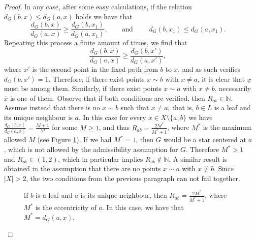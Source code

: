 \documentclass[a4paper,11pt,oneside]{amsart}
\newcommand{\N}{{\mathbb N}}
\begin{document}
\begin{proof}
In any case, after some easy calculations, if the relation $d_G(b,x)\leq d_G(a,x)$ holds we have that
$$ \frac{d_G(b,x)}{d_G(a,x)} \geq \frac{d_G(b,x_1)}{d_G(a,x_1)}, \qquad \mbox{and } \qquad d_G(b,x_1)\leq d_G(a,x_1). $$
Repeating this process a finite amount of times, we find that $$ \frac{d_G(b,x)}{d_G(a,x)} \geq \frac{d_G(b,x')}{d_G(a,x')}, $$
where $x'$ is the second point in the fixed path from $b$ to $x$, and as such verifies $d_G(b,x')=1$. Therefore, if there exist points $x\sim b$ with $x\neq a$, it is clear that $\underline x$ must be among them. Similarly, if there exist points $x\sim a$ with $x\neq b$, necessarily $\overline x$ is one of them. Observe that if both conditions are verified, then $R_{ab}\in \N$.
\\

Assume instead that there is no $x\sim b$ such that $x\neq a$, that is, $b\in L$ is a leaf and its unique neighbour is $a$. In this case for every $x\in X\setminus\{a,b\}$ we have $\frac{d_G(b,x)}{d_G(a,x)} = \frac{M+1}{M}$
for some $M\geq 1$, and thus $R_{ab}= \frac{2M^*}{M^*+1}$, where $M^*$ is the maximum allowed $M$ (see Figure \ref{figure-M-star}). If we had $M^*=1$, then $G$ would be a star centered at $a$, which is not allowed by the admissibility assumption for $G$. Therefore $M^*>1$ and $R_{ab} \in (1,2)$, which in particular implies $R_{ab}\notin\N$. A similar result is obtained in the assumption that there are no points $x\sim a$ with $x\neq b$. Since $|X|>2$, the two conditions from the previous paragraph can not fail together.\\

\begin{figure}[!h]
\centering
{}
\caption{If $b$ is a leaf and $a$ is its unique neighbour, then $R_{ab}=\frac{2M^*}{M^*+1}$, where $M^*$ is the eccentricity of $a$. In this case, we have that $M^*=d_G(a,\underline x)$.}
\label{figure-M-star}
\end{figure}


\end{proof}
\end{document}
